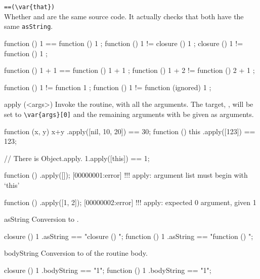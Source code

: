 \begin{urbiscriptapi}
\item \lstinline|==(\var{that})|\\
  Whether \this and  are the same source code.
  It actually checks that both have the same \lstinline|asString|.
\begin{urbiassert}
function () { 1 } == function () { 1 };
function () { 1 } != closure  () { 1 };
closure  () { 1 } != function () { 1 };

function () { 1 + 1 } == function () { 1 + 1 };
function () { 1 + 2 } != function () { 2 + 1 };

function () { 1 } != function { 1 };
function () { 1 } != function (ignored) { 1 };
\end{urbiassert}

\item[apply](<args>)%
  Invoke the routine, with all the arguments.  The target,
  \this, will be set to \lstinline|\var{args}[0]| and the
  remaining arguments with be given as arguments.
\begin{urbiassert}
function (x, y) { x+y }.apply([nil, 10, 20]) == 30;
function () { this }.apply([123]) == 123;

// There is Object.apply.
1.apply([this]) == 1;
\end{urbiassert}
\begin{urbiscript}
function () {}.apply([]);
[00000001:error] !!! apply: argument list must begin with `this'

function () {}.apply([1, 2]);
[00000002:error] !!! apply: expected 0 argument, given 1
\end{urbiscript}

\item[asString]
  Conversion to .
\begin{urbiassert}
closure  () { 1 }.asString == "closure () {\n}";
function () { 1 }.asString == "function () {\n}";
\end{urbiassert}

\item[bodyString]
  Conversion to  of the routine body.
\begin{urbiassert}
closure  () { 1 }.bodyString == "1";
function () { 1 }.bodyString == "1";
\end{urbiassert}

\end{urbiscriptapi}

